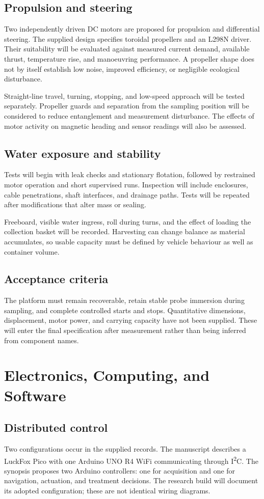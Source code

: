 \documentclass[12pt,a4paper]{article}
\newcommand{\papersection}[1]{\clearpage\section{#1}}
\begin{document}
\subsection{Propulsion and steering}
Two independently driven DC motors are proposed for propulsion and differential steering. The supplied design specifies toroidal propellers and an L298N driver. Their suitability will be evaluated against measured current demand, available thrust, temperature rise, and manoeuvring performance. A propeller shape does not by itself establish low noise, improved efficiency, or negligible ecological disturbance.

Straight-line travel, turning, stopping, and low-speed approach will be tested separately. Propeller guards and separation from the sampling position will be considered to reduce entanglement and measurement disturbance. The effects of motor activity on magnetic heading and sensor readings will also be assessed.

\subsection{Water exposure and stability}
Tests will begin with leak checks and stationary flotation, followed by restrained motor operation and short supervised runs. Inspection will include enclosures, cable penetrations, shaft interfaces, and drainage paths. Tests will be repeated after modifications that alter mass or sealing.

Freeboard, visible water ingress, roll during turns, and the effect of loading the collection basket will be recorded. Harvesting can change balance as material accumulates, so usable capacity must be defined by vehicle behaviour as well as container volume.

\subsection{Acceptance criteria}
The platform must remain recoverable, retain stable probe immersion during sampling, and complete controlled starts and stops. Quantitative dimensions, displacement, motor power, and carrying capacity have not been supplied. These will enter the final specification after measurement rather than being inferred from component names.

\papersection{Electronics, Computing, and Software}
\subsection{Distributed control}
Two configurations occur in the supplied records. The manuscript describes a LuckFox Pico with one Arduino UNO R4 WiFi communicating through I\textsuperscript{2}C. The synopsis proposes two Arduino controllers: one for acquisition and one for navigation, actuation, and treatment decisions. The research build will document its adopted configuration; these are not identical wiring diagrams.
\end{document}
